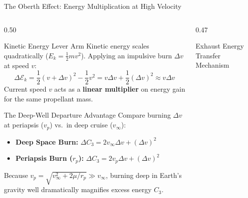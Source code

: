 \documentclass[aspectratio=169, 10pt]{beamer}
\begin{document}
\begin{frame}{The Oberth Effect: Energy Multiplication at High Velocity}
    \begin{columns}[t]
        \begin{column}{0.50\textwidth}
            \begin{block}{Kinetic Energy Lever Arm}
                \scriptsize
                Kinetic energy scales quadratically ($E_k = \frac{1}{2} m v^2$). Applying an impulsive burn $\Delta v$ at speed $v$:
                \vspace{-0.08cm}
                \begin{equation*}
                    \Delta \mathcal{E}_k = \frac{1}{2}(v + \Delta v)^2 - \frac{1}{2}v^2 = v \Delta v + \frac{1}{2}(\Delta v)^2 \approx v \Delta v
                \end{equation*}
                \vspace{-0.05cm}
                Current speed $v$ acts as a \textbf{linear multiplier} on energy gain for the same propellant mass.
            \end{block}

            \vspace{-0.08cm}

            \begin{block}{The Deep-Well Departure Advantage}
                \scriptsize
                Compare burning $\Delta v$ at periapsis ($v_p$) vs.\ in deep cruise ($v_\infty$):
                \begin{itemize}\setlength{\itemsep}{1pt}
                    \item \textbf{Deep Space Burn:} $\Delta C_3 = 2 v_\infty \Delta v + (\Delta v)^2$
                    \item \textbf{Periapsis Burn ($r_p$):} $\Delta C_3 = 2 v_p \Delta v + (\Delta v)^2$
                \end{itemize}
                Because $v_p = \sqrt{v_\infty^2 + 2\mu/r_p} \gg v_\infty$, burning deep in Earth's gravity well dramatically magnifies excess energy $C_3$.
            \end{block}
        \end{column}

        \begin{column}{0.47\textwidth}
            \begin{block}{Exhaust Energy Transfer Mechanism}
                \centering
                \vspace{0.05cm}
\end{block}
\end{column}
\end{columns}
\end{frame}
\end{document}
